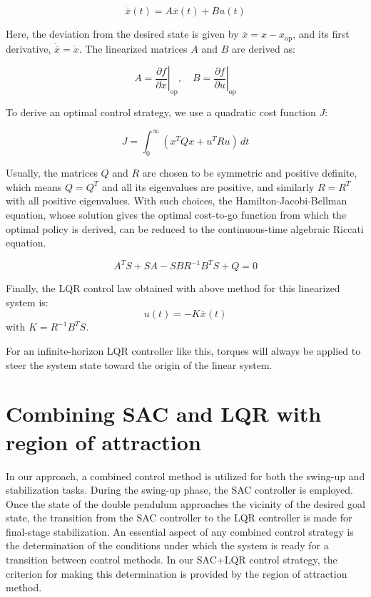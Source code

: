 \begin{equation}
\dot{\overline{x}}(t) = A \overline{x}(t) + B u(t)
\end{equation}


Here, the deviation from the desired state is given by \(\overline{x} = x - x_{\text{op}}\), and its first derivative, \(\dot{\overline{x}} = \dot{x}\). The linearized  matrices \(A\) and \(B\) are derived as:

\begin{equation}
 A = \left.\frac{\partial f}{\partial x}\right|_{\text{op}}, \quad B = \left.\frac{\partial f}{\partial u}\right|_{\text{op}}
\end{equation}


To derive an optimal control strategy, we use a quadratic cost function \(J\):

\begin{equation}
  J = \int_0^{\infty} \left( x^T Q x + u^T R u \right) \, dt
\end{equation}

Usually, the matrices \(Q\) and \(R\) are chosen to be symmetric and positive definite, which means \(Q = Q^T\) and all its eigenvalues are positive, and similarly \(R = R^T\) with all positive eigenvalues. With such choices, the Hamilton-Jacobi-Bellman equation, whose solution gives the optimal cost-to-go function from which the optimal policy is derived, can be reduced to the continuous-time algebraic Riccati equation.

\begin{equation}
 A^T S + SA - SBR^{-1}B^T S + Q = 0
\end{equation}

Finally, the LQR control law obtained with above method for this linearized system is:
\begin{equation}
 u(t) = -K\overline{x}(t)
\end{equation}
with \(K = R^{-1}B^T S\).

For an infinite-horizon LQR controller like this, torques will always be applied to steer the system state toward the origin of the linear system.


\section{Combining SAC and LQR with region of attraction}

In our approach, a combined control method is utilized for both the swing-up and stabilization tasks. During the swing-up phase, the SAC controller is employed. Once the state of the double pendulum approaches the vicinity of the desired goal state, the transition from the SAC controller to the LQR controller is made for final-stage stabilization. An essential aspect of any combined control strategy is the determination of the conditions under which the system is ready for a transition between control methods. In our SAC+LQR control strategy, the criterion for making this determination is provided by the region of attraction method\cite{maywald2022co}.

